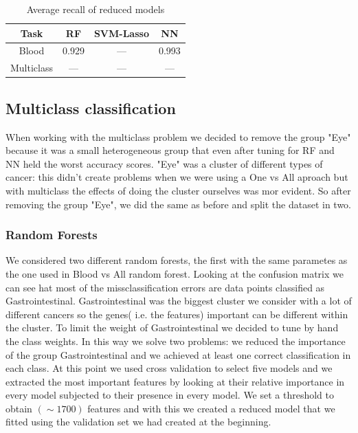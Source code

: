 \documentclass[a4paper,11pt, oneside]{article}  %
\begin{document}
\begin{table}[h!]
	\caption{Average recall of reduced models}
	\centering
	\begin{tabular}{c c c c}
		\hline\hline
		Task & RF & SVM-Lasso & NN \\ [0.5ex] %
		\hline
		Blood & 0.929 & --- & 0.993 \\
		Multiclass & --- &  --- & --- \\ [1ex]
		\hline
	\end{tabular}
	\label{table:reduced_models}
\end{table}





\subsection{Multiclass classification}
When working with the multiclass problem we decided to remove the group "Eye" because it was a small heterogeneous group that even after tuning for RF and NN held the worst accuracy scores. "Eye" was a cluster of different types of cancer: this didn't create problems when we were using a One vs All aproach but with multiclass the effects of doing the cluster ourselves was mor evident.  
So after removing the group "Eye", we did the same as before and split the dataset in two.

\subsubsection{Random Forests}
We considered two different random forests, the first with the same parametes as the one used in Blood vs All random forest. Looking at the confusion matrix we can see hat most of the missclassification errors are data points classified as Gastrointestinal. Gastrointestinal was the biggest cluster we consider with a lot of different cancers so the genes( i.e. the features) important can be different within the cluster. To limit the weight of Gastrointestinal we decided to tune by hand the class weights. In this way we solve two problems: we reduced the importance of the group Gastrointestinal and we achieved at least one correct classification in each class. At this point we used cross validation to select five models and we extracted the most important features by looking at their relative importance in every model subjected to their presence in every model. We set a threshold to obtain  $(\sim   1700)$ features and with this we created a reduced model that we fitted using the validation set we had created at the beginning.
\end{document}
